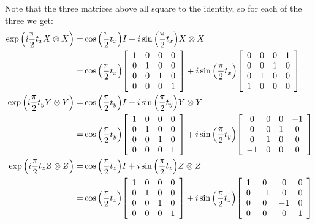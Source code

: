 \documentclass{article}
\begin{document}
Note that the three matrices above all square to the identity, so for each of the three we get:
\begin{align*}
  \exp\pqty{i\frac{\pi}{2}t_x X\otimes X} =& \cos\pqty{\frac{\pi}{2}t_x} I + i\sin\pqty{\frac{\pi}{2}t_x} X\otimes X \\
  =& 
  \cos\pqty{\frac{\pi}{2}t_x}
  \bqty{
  \begin{array}{cccc}
    1&0&0&0 \\
    0&1&0&0 \\
    0&0&1&0 \\
    0&0&0&1 \\
  \end{array}
  }
  +
  i\sin\pqty{\frac{\pi}{2}t_x}
  \bqty{
  \begin{array}{cccc}
    0&0&0&1 \\
    0&0&1&0 \\
    0&1&0&0 \\
    1&0&0&0 \\
  \end{array}
  }
  \\
  \exp\pqty{i\frac{\pi}{2}t_y Y\otimes Y} =& \cos\pqty{\frac{\pi}{2}t_y} I + i\sin\pqty{\frac{\pi}{2}t_y} Y\otimes Y \\
  =& 
  \cos\pqty{\frac{\pi}{2}t_y}
  \bqty{
  \begin{array}{cccc}
    1&0&0&0 \\
    0&1&0&0 \\
    0&0&1&0 \\
    0&0&0&1 \\
  \end{array}
  }
  +
  i\sin\pqty{\frac{\pi}{2}t_y}
  \bqty{
  \begin{array}{cccc}
    0&0&0&-1 \\
    0&0&1&0 \\
    0&1&0&0 \\
    -1&0&0&0 \\
  \end{array}
  }
  \\
  \exp\pqty{i\frac{\pi}{2}t_z Z\otimes Z} =& \cos\pqty{\frac{\pi}{2}t_z} I + i\sin\pqty{\frac{\pi}{2}t_z} Z\otimes Z \\
  =& 
  \cos\pqty{\frac{\pi}{2}t_z}
  \bqty{
  \begin{array}{cccc}
    1&0&0&0 \\
    0&1&0&0 \\
    0&0&1&0 \\
    0&0&0&1 \\
  \end{array}
  }
  +
  i\sin\pqty{\frac{\pi}{2}t_z}
  \bqty{
  \begin{array}{cccc}
    1&0&0&0 \\
    0&-1&0&0 \\
    0&0&-1&0 \\
    0&0&0&1 \\
  \end{array}
  }
\end{align*}
\end{document}
